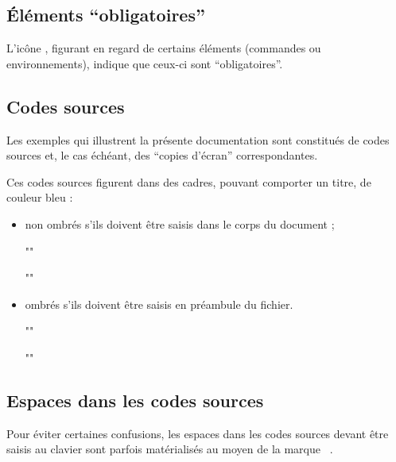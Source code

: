 \documentclass[french,nolocaltoc]{nwejmart}
\newtheorem[title=Fait,style=definition]{fact}
\begin{document}
\subsection{Éléments \enquote{obligatoires}}
\label{sec-comm-oblig}

L'icône \mandatory{}, figurant en regard de certains éléments (commandes ou
environnements), indique que ceux-ci sont \enquote{obligatoires}.

\subsection{Codes sources}
\label{sec-codes-sources}

Les exemples qui illustrent la présente documentation sont constitués de codes
sources et, le cas échéant, des \enquote{copies d'écran} correspondantes.

Ces codes sources figurent dans des cadres, pouvant comporter un titre, de
couleur bleu :
\begin{itemize}
\item non ombrés s'ils doivent être saisis dans le corps du document ;
\begin{bodycode}
""
\end{bodycode}
\begin{bodycode}[title=\meta{titre}]
""
\end{bodycode}
\item ombrés s'ils doivent être saisis en préambule du fichier.
\begin{preamblecode}
""
\end{preamblecode}
\begin{preamblecode}[title=\meta{titre}]
""
\end{preamblecode}
\end{itemize}

\subsection{Espaces dans les codes sources}
\label{sec-espaces-dans-les}

Pour éviter certaines confusions, les espaces dans les codes sources devant
être saisis au clavier sont parfois matérialisés au moyen de la marque
\lstinline[showspaces]+ +.
\end{document}
